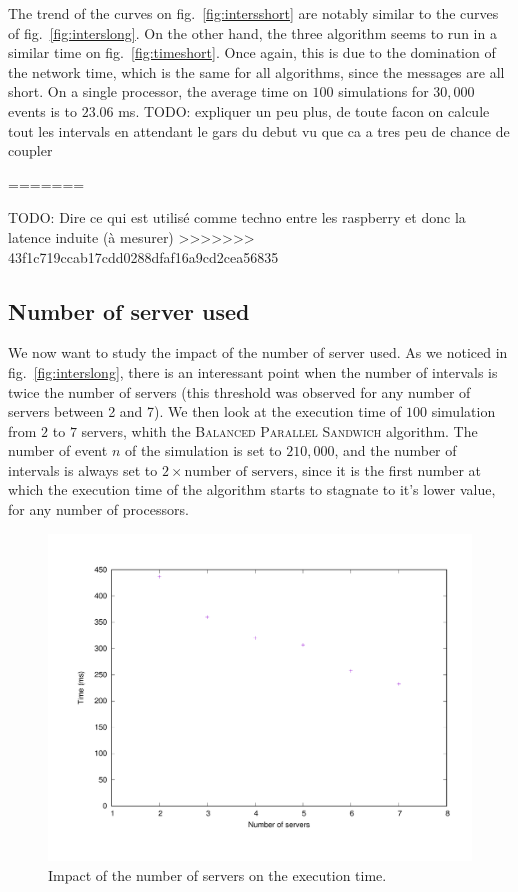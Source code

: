 \documentclass[a4paper,10pt]{article}
\newcommand{\todo}[1]{{\color{red} TODO: {#1}}}
\begin{document}
The trend of the curves on fig.~\ref{fig:intersshort} are notably similar to the curves of fig.~\ref{fig:interslong}. 
On the other hand, the three algorithm seems to run in a similar time on fig.~\ref{fig:timeshort}. Once again, this is due to the domination of the network time, which is the same for all algorithms, since the messages are all short.
On a single processor, the average time on $100$ simulations for $30,000$ events is to $23.06$ ms.
\todo{expliquer un peu plus, de toute facon on calcule tout les intervals en attendant le gars du debut vu que ca a tres peu de chance de coupler}

=======

\todo{Dire ce qui est utilisé comme techno entre les raspberry et donc la latence induite (à mesurer)}
>>>>>>> 43f1c719ccab17cdd0288dfaf16a9cd2cea56835

\subsection{Number of server used}
We now want to study the impact of the number of server used. As we noticed in fig.~\ref{fig:interslong}, there is an interessant point when the number of intervals is twice the number of servers (this threshold was observed for any number of servers between 2 and 7). We then look at the execution time of $100$ simulation from $2$ to $7$ servers, whith the \textsc{Balanced Parallel Sandwich} algorithm. The number of event $n$ of the simulation is set to $210,000$, and the number of intervals is always set to $2 \times \textrm{number of servers}$, since it is the first number at which the execution time of the algorithm starts to stagnate to it's lower value, for any number of processors.

\begin{figure}[H]
\centering
\label{fig:nbservs}
 \includegraphics[scale=0.45]{numberofservers.pdf}
 \caption{Impact of the number of servers on the execution time.}
\end{figure}
\end{document}
